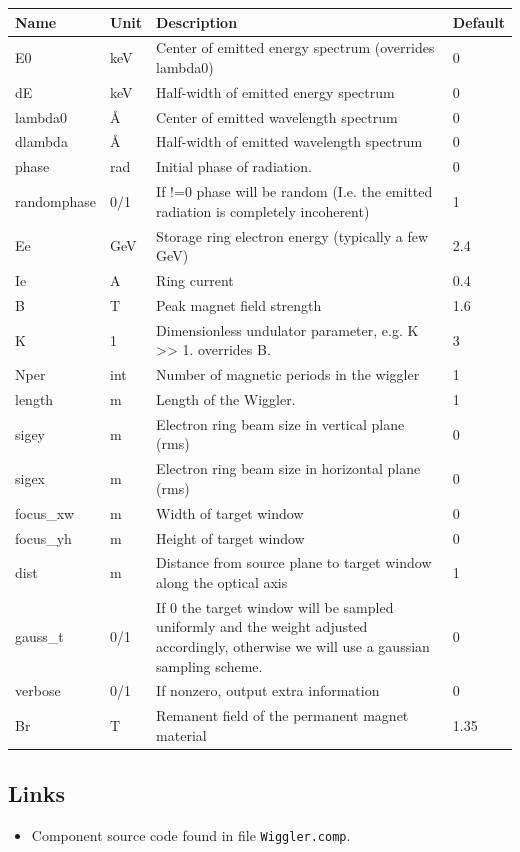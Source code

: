 \begin{longtable}{p{}p{}p{}p{}}
\toprule
\textbf{Name} & \textbf{Unit} & \textbf{Description} & \textbf{Default} \\
\midrule
\endhead
E0 & keV & Center of emitted energy spectrum (overrides lambda0) & 0 \\
dE & keV & Half-width of emitted energy spectrum & 0 \\
lambda0 & \AA{} & Center of emitted wavelength spectrum & 0 \\
dlambda & \AA{} & Half-width of emitted wavelength spectrum & 0 \\
phase & rad & Initial phase of radiation. & 0 \\
randomphase & 0/1 & If !=0 phase will be random (I.e. the emitted radiation is completely incoherent) & 1 \\
Ee & GeV & Storage ring electron energy (typically a few GeV) & 2.4 \\
Ie & A & Ring current & 0.4 \\
B & T & Peak magnet field strength & 1.6 \\
K & 1 & Dimensionless undulator parameter, e.g. K \textgreater{}\textgreater{} 1. overrides B. & 3 \\
Nper & int & Number of magnetic periods in the wiggler & 1 \\
length & m & Length of the Wiggler. & 1 \\
sigey & m & Electron ring beam size in vertical plane (rms) & 0 \\
sigex & m & Electron ring beam size in horizontal plane (rms) & 0 \\
focus\_xw & m & Width of target window & 0 \\
focus\_yh & m & Height of target window & 0 \\
dist & m & Distance from source plane to target window along the optical axis & 1 \\
gauss\_t & 0/1 & If 0 the target window will be sampled uniformly and the weight adjusted accordingly, otherwise we will use a gaussian sampling scheme. & 0 \\
verbose & 0/1 & If nonzero, output extra information & 0 \\
Br & T & Remanent field of the permanent magnet material & 1.35 \\
\bottomrule
\end{longtable}

\subsection*{Links}
\begin{itemize}
  \item Component source code found in file \texttt{Wiggler.comp}.
\end{itemize}
